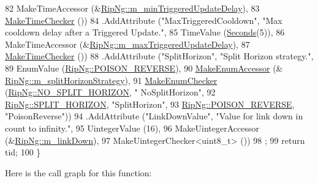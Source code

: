 \begin{DoxyCode}
82                    MakeTimeAccessor (&\hyperlink{classns3_1_1RipNg_a4da2b49a558678bd4c51a995fbfbf7af}{RipNg::m\_minTriggeredUpdateDelay}),
83                    \hyperlink{group__time_ga7032965bd4afa578691d88c09e4481c1}{MakeTimeChecker} ())
84     .AddAttribute (\textcolor{stringliteral}{"MaxTriggeredCooldown"}, \textcolor{stringliteral}{"Max cooldown delay after a Triggered Update."},
85                    TimeValue (\hyperlink{group__timecivil_ga33c34b816f8ff6628e33d5c8e9713b9e}{Seconds}(5)),
86                    MakeTimeAccessor (&\hyperlink{classns3_1_1RipNg_a7087e78333b3a5caabc13a83753a13a2}{RipNg::m\_maxTriggeredUpdateDelay}),
87                    \hyperlink{group__time_ga7032965bd4afa578691d88c09e4481c1}{MakeTimeChecker} ())
88     .AddAttribute (\textcolor{stringliteral}{"SplitHorizon"}, \textcolor{stringliteral}{"Split Horizon strategy."},
89                    EnumValue (\hyperlink{classns3_1_1RipNg_a2baa3148870b411bccfe688079fb40a7a68187e765b02506b3891b87a513fac2f}{RipNg::POISON\_REVERSE}),
90                    \hyperlink{namespacens3_af5050739867ce63896dec011e332c8ec}{MakeEnumAccessor} (&
      \hyperlink{classns3_1_1RipNg_a2aaaf4747380a0960cc48cb04ae99a1a}{RipNg::m\_splitHorizonStrategy}),
91                    \hyperlink{namespacens3_a48832781a2b521d3d0091e05ece30615}{MakeEnumChecker} (\hyperlink{classns3_1_1RipNg_a2baa3148870b411bccfe688079fb40a7a87060df7c85bafc99b78440f423a171b}{RipNg::NO\_SPLIT\_HORIZON}, \textcolor{stringliteral}{"
      NoSplitHorizon"},
92                                     \hyperlink{classns3_1_1RipNg_a2baa3148870b411bccfe688079fb40a7a65efd4b3a6b5b8be8e16038fec0cad4e}{RipNg::SPLIT\_HORIZON}, \textcolor{stringliteral}{"SplitHorizon"},
93                                     \hyperlink{classns3_1_1RipNg_a2baa3148870b411bccfe688079fb40a7a68187e765b02506b3891b87a513fac2f}{RipNg::POISON\_REVERSE}, \textcolor{stringliteral}{"PoisonReverse"}))
94     .AddAttribute (\textcolor{stringliteral}{"LinkDownValue"}, \textcolor{stringliteral}{"Value for link down in count to infinity."},
95                    UintegerValue (16),
96                    MakeUintegerAccessor (&\hyperlink{classns3_1_1RipNg_a6752c1bb1fc0909f0493033d426f2b92}{RipNg::m\_linkDown}),
97                    MakeUintegerChecker<uint8\_t> ())
98     ;
99   \textcolor{keywordflow}{return} tid;
100 \}
\end{DoxyCode}


Here is the call graph for this function\+:


